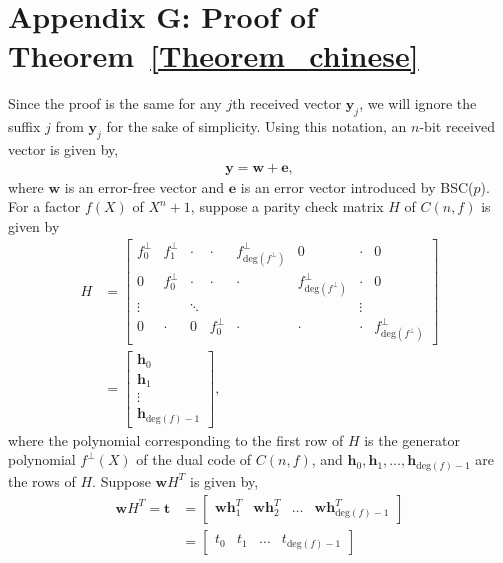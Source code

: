 \documentclass[10pt,journal]{IEEEtran}
\def \deg{{\mathrm{deg}}}
\begin{document}
\section*{Appendix G: Proof of Theorem~\ref{Theorem_chinese}}
%  
Since the proof is the same for any $j$th received vector $\mathbf{y}_j$, we will ignore the suffix $j$
from $\mathbf{y}_j$ for the sake of simplicity.
Using this notation, an $n$-bit received vector is given by,
% 
\begin{align}
%  
\mathbf{y} = \mathbf{w} + \mathbf{e},
\label{Eqn_chinese_y_w_e}
% 
\end{align}
% 
where $\mathbf{w}$ is an error-free vector and $\mathbf{e}$ is an error vector introduced by BSC($p$).
For a factor $f(X)$ of $X^n+1$, suppose a parity check matrix $H$ of $C(n,f)$ is given by
% 
\begin{align}
% 
H & = \begin{bmatrix}
      f^{\perp}_0    & f^{\perp}_{1}   & \cdot  & \cdot   & f^{\perp}_{\deg(f^{\perp})} & 0 & \cdot & 0 \\
      0      & f^{\perp}_0   & \cdot  & \cdot   & \cdot   & f^{\perp}_{\deg(f^{\perp})}   & \cdot & 0 \\
      \vdots &  &  \ddots  &  &         &         & \vdots    &   \\
      0      & \cdot & 0      & f^{\perp}_0     & \cdot   & \cdot     & \cdot & f^{\perp}_{\deg(f^{\perp})}
    \end{bmatrix} \nonumber \\
    & =
    \begin{bmatrix}
      \mathbf{h}_0 \\
      \mathbf{h}_1 \\
      \vdots \\
      \mathbf{h}_{\deg(f)-1}
    \end{bmatrix},
\label{Eqn_H_Cnf_app}    
% 
\end{align}
% 
where the polynomial corresponding to the first row of $H$ is the generator polynomial $f^{\perp}(X)$ of the dual code of $C(n,f)$, and 
$\mathbf{h}_0, \mathbf{h}_1, \ldots, \mathbf{h}_{\deg(f)-1}$ are the rows of $H$.
Suppose $\mathbf{w}H^T$ is given by,
% 
\begin{align}
%  
\mathbf{w} H^T = \mathbf{t} &= \begin{bmatrix} \mathbf{w}\mathbf{h}_1^T & \mathbf{w}\mathbf{h}_2^T & \ldots & \mathbf{w}\mathbf{h}_{\deg(f)-1}^T \end{bmatrix}\\
			   &= \begin{bmatrix} t_0 & t_1 & \ldots & t_{\deg(f)-1}\end{bmatrix} 			   
\label{Eqn_tl}			   
% 
\end{align}
\end{document}
